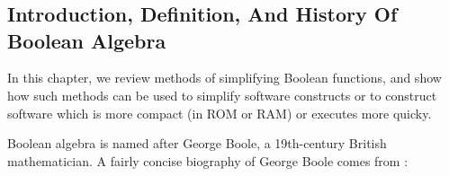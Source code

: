 
\chapter[\cbalzeroshorttitle{}]{\cbalzerolongtitle{}}

\label{cbal0}

\section{Introduction, Definition, And History Of Boolean Algebra}
\label{cbal0:sint0}

In this chapter, we review methods of 
simplifying Boolean functions, and
show how such methods can be used to simplify software constructs
or to construct software which is more compact (in ROM or RAM) 
or executes more quicky.

Boolean algebra is named after George Boole, 
a 19th-century British mathematician.
A fairly concise biography of George Boole comes from 
\cite{bibref:w:georgeboolebio01}:

